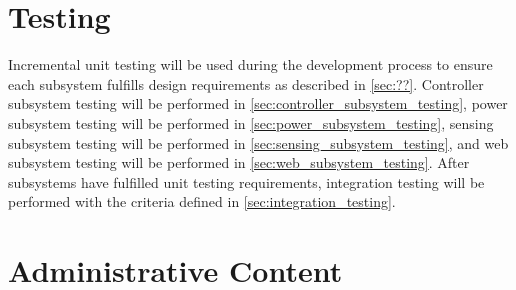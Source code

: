 \documentclass[12pt]{article}
\begin{document}
\section{Testing}                               %
Incremental unit testing will be used during the development process
to ensure each subsystem fulfills design requirements as described in
\autoref{sec:??}. Controller subsystem testing will be performed in
\autoref{sec:controller_subsystem_testing}, power subsystem testing will be
performed in \autoref{sec:power_subsystem_testing}, sensing subsystem testing
will be performed in \autoref{sec:sensing_subsystem_testing}, and web subsystem
testing will be performed in \autoref{sec:web_subsystem_testing}. After
subsystems have fulfilled unit testing requirements, integration testing will
be performed with the criteria defined in \autoref{sec:integration_testing}.

\section{Administrative Content}                %
\end{document}
